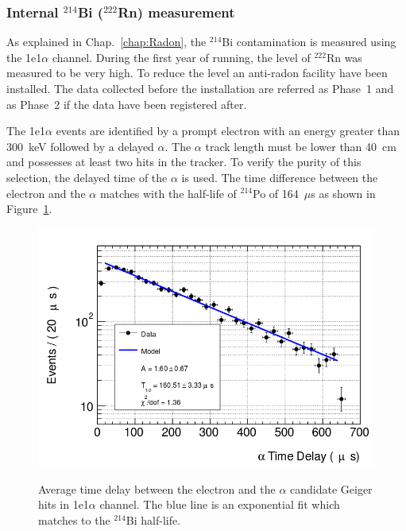 \documentclass[main.tex]{subfiles}
\begin{document}
\FloatBarrier


\subsubsection{Internal $^{\text{214}}$Bi ($^{\text{222}}$Rn) measurement} \label{sec:1e1aChannel}


\NI As explained in Chap.~\ref{chap:Radon}, the $^{\text{214}}$Bi contamination is measured using the 1e1$\alpha$ channel. During the first year of running, the level of $^{\text{222}}$Rn was measured to be very high. To reduce the level an anti-radon facility have been installed. The data collected before the installation are referred as Phase~1 and as Phase~2 if the data have been registered after.


\bigskip


\NI The 1e1$\alpha$ events are identified by a prompt electron with an energy greater than 300~keV followed by a delayed $\alpha$. The $\alpha$ track length must be lower than 40~cm and possesses at least two hits in the tracker. To verify the purity of this selection, the delayed time of the $\alpha$ is used. The time difference between the electron and the $\alpha$ matches with the half-life of $^{\text{214}}$Po of 164~$\mu$s as shown in Figure~\ref{1e1aChannel_alphaDelayTime}.


\begin{figure}[h!]
\centering
\includegraphics[scale=0.4]{pictures/Chap6/alphaTimeDelay1e1aChannel.png}
\label{1e1aChannel_alphaDelayTime}
\caption{Average time delay between the electron and the $\alpha$ candidate Geiger hits in 1e1$\alpha$ channel. The blue line is an exponential fit which matches to the $^{\text{214}}$Bi half-life.}
\end{figure}
\end{document}
